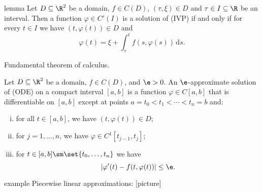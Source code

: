 \documentclass[class=article, crop=false]{standalone}
\begin{document}
\begin{result}{lemma}
  Let $D\subseteq \R^2$ be a domain, $f \in C(D)$, $(\tau, \xi) \in D$ and $\tau \in I \subseteq \R$ be an interval. Then a function $\varphi \in C'(I)$ is a solution of (IVP) if and only if for every $t \in I$ we have $(t,\varphi(t)) \in D$ and
    \[
      \varphi(t) = \xi + \int_{\tau}^{t} f(s,\varphi(s)) \, \mathrm{d}s.
    \]
\end{result}
\begin{pf}
  Fundamental theorem of calculus.
\end{pf}

\begin{defn}
  Let $D \subseteq \R^2$ be a domain, $f \in C(D)$, and $\e > 0$. An $\e$-approximate solution of (ODE) on a compact interval $[a,b]$ is a function $\varphi \in C[a,b]$ that is differentiable on $[a,b]$ except at points $a = t_0 < t_1 < \cdots < t_n = b$ and:
  \begin{enumerate}[(i)]
    \item for all $t \in [a,b]$, we have $(t,\varphi(t)) \in D$;
    \item for $j=1,\ldots,n$, we have $\varphi \in C^1[t_{j-1},t_j]$;
    \item for $t \in [a,b] \sm \set{t_0,\ldots,t_n}$ we have
      \[
        |\varphi'(t)-f(t,\varphi(t))| \leq \e.
      \]
  \end{enumerate}
\end{defn}

\begin{understandingcheck}{example}
  Piecewise linear approximations:
  [picture]
\end{understandingcheck}
\end{document}
